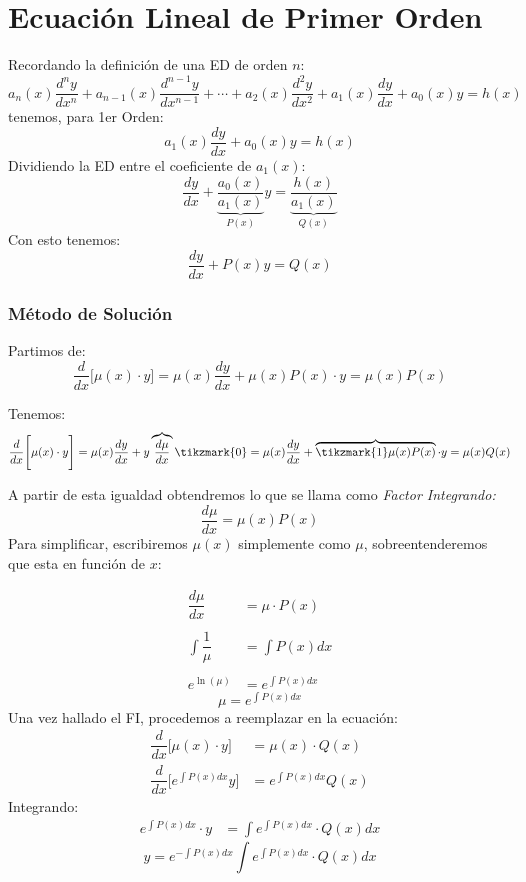 \chapter{Ecuación Lineal de Primer Orden}
Recordando la definición de una ED de orden $n$:
$$a_n(x)\dfrac{d^ny}{dx^n}+a_{n-1}(x)\dfrac{d^{n-1}y}{dx^{n-1}}+\cdots + a_2(x)\dfrac{d^2y}{dx^2}+a_1(x)\dfrac{dy}{dx}+a_0(x)y=h(x)$$
tenemos, para 1er Orden:
\begin{equation}
a_1(x)\dfrac{dy}{dx}+a_0(x)y=h(x)
\end{equation}
Dividiendo la ED entre el coeficiente de $a_1(x)$:
$$\dfrac{dy}{dx}+\underbrace{\dfrac{a_0(x)}{a_1(x)}}_{P(x)}y=\underbrace{\dfrac{h(x)}{a_1(x)}}_{Q(x)}$$
Con esto tenemos:
\begin{equation}
\dfrac{dy}{dx}+P(x)y=Q(x)
\end{equation}
\subsection*{Método de Solución}
Partimos de:
$$\dfrac{d}{dx}\Bigg[\mu(x)\cdot y\Bigg]=\mu(x)\dfrac{dy}{dx}+\mu(x)P(x) \cdot y = \mu(x)P(x) $$

Tenemos:
\[
\dfrac{d}{dx}\Bigg[\mu(x)\cdot y\Bigg]=\mu(x)\dfrac{dy}{dx}+y  \overbrace{\dfrac{d\mu}{dx}}\tikzmark{0}=\mu(x)\dfrac{dy}{dx}+ \overbrace{\tikzmark{1}\mu(x)P(x)}\cdot y =  \mu(x)Q(x)
\]
%
A partir de esta igualdad obtendremos lo que se llama como \textit{Factor Integrando:}
$$\dfrac{d\mu}{dx}=\mu(x)P(x)$$
Para simplificar, escribiremos $\mu(x)$ simplemente como $\mu$, sobreentenderemos que esta en función de $x$:

\begin{align*}
\dfrac{d\mu}{dx} & = \mu \cdot P(x) \\{ }\\
\int\dfrac{1}{\mu} & = \int P(x) dx \\{ }\\
e^{\ln(\mu)} & = e^{\int P(x) dx}
\end{align*}
\begin{equation}
\mu  = e^{\int P(x) dx}
\end{equation}
Una vez hallado el FI, procedemos a reemplazar en la ecuación:
\begin{align*}
\dfrac{d}{dx}\Big[ \mu(x)\cdot y \Big] & = \mu(x)\cdot Q(x) \\
\dfrac{d}{dx}\Big[ e^{\int P(x)dx} y \Big] & = e^{\int P(x) dx} Q(x)
\end{align*}
Integrando:
\begin{align*}
e^{\int P(x) dx} \cdot y & = \int e^{\int P(x) dx} \cdot Q(x) dx
\end{align*}
$$ \boxed{y  = e^{-\int P(x) dx} \int e^{\int P(x) dx} \cdot Q(x) dx}$$
